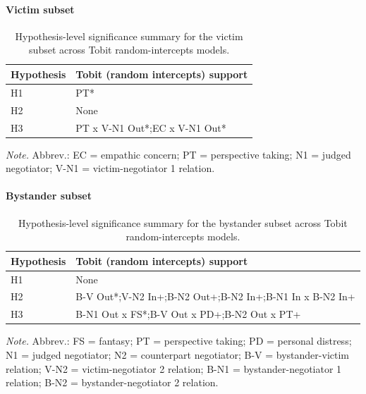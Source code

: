 \documentclass[11pt]{article}
\begin{document}
\paragraph{Victim subset}
\begin{table}[H]
\centering
{\fontsize{11}{13}\selectfont
\renewcommand{\arraystretch}{1.15}
\caption{Hypothesis-level significance summary for the victim subset across Tobit random-intercepts models.}
\label{tab:hypothesis_summary_victim}
\begin{tabular}{>{\raggedright\arraybackslash}p{}>{\raggedright\arraybackslash}p{}}
\toprule
Hypothesis & Tobit (random intercepts) support \\
\midrule
H1 & PT* \\
H2 & None \\
H3 & PT x V-N1 Out*;\newline EC x V-N1 Out* \\
\bottomrule
\end{tabular}
}
\end{table}
\begin{flushleft}
\footnotesize\textit{Note.} Abbrev.: EC = empathic concern; PT = perspective taking; N1 = judged negotiator; V-N1 = victim-negotiator 1 relation.
\end{flushleft}

\paragraph{Bystander subset}
\begin{table}[H]
\centering
{\fontsize{11}{13}\selectfont
\renewcommand{\arraystretch}{1.15}
\caption{Hypothesis-level significance summary for the bystander subset across Tobit random-intercepts models.}
\label{tab:hypothesis_summary_bystander}
\begin{tabular}{>{\raggedright\arraybackslash}p{}>{\raggedright\arraybackslash}p{}}
\toprule
Hypothesis & Tobit (random intercepts) support \\
\midrule
H1 & None \\
H2 & B-V Out*;\newline V-N2 In+;\newline B-N2 Out+;\newline B-N2 In+;\newline B-N1 In x B-N2 In+ \\
H3 & B-N1 Out x FS*;\newline B-V Out x PD+;\newline B-N2 Out x PT+ \\
\bottomrule
\end{tabular}
}
\end{table}
\begin{flushleft}
\footnotesize\textit{Note.} Abbrev.: FS = fantasy; PT = perspective taking; PD = personal distress; N1 = judged negotiator; N2 = counterpart negotiator; B-V = bystander-victim relation; V-N2 = victim-negotiator 2 relation; B-N1 = bystander-negotiator 1 relation; B-N2 = bystander-negotiator 2 relation.
\end{flushleft}
\end{document}
